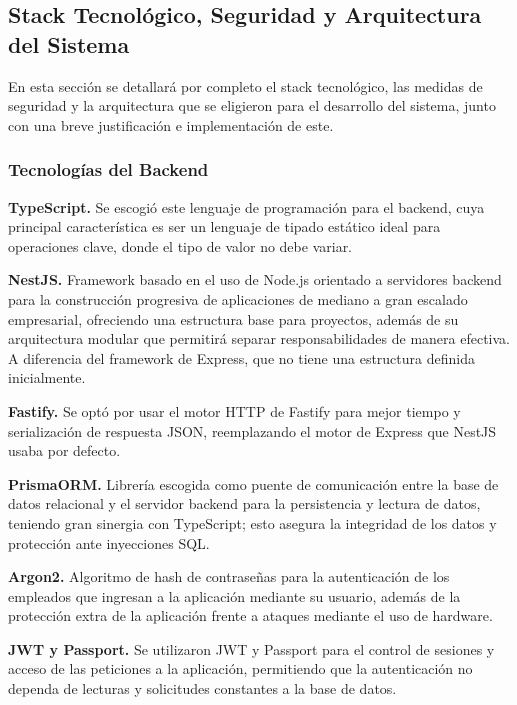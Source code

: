 \subsection{Stack Tecnológico, Seguridad y Arquitectura del Sistema}

En esta sección se detallará por completo el stack tecnológico, las medidas de seguridad y la arquitectura que se eligieron para el desarrollo del sistema, junto con una breve justificación e implementación de este. 

\subsubsection{Tecnologías del Backend}

\textbf{TypeScript.} Se escogió este lenguaje de programación para el backend, cuya principal característica es ser un lenguaje de tipado estático ideal para operaciones clave, donde el tipo de valor no debe variar. \par

\textbf{NestJS.} Framework basado en el uso de Node.js orientado a servidores backend para la construcción progresiva de aplicaciones de mediano a gran escalado empresarial, ofreciendo una estructura base para proyectos, además de su arquitectura modular que permitirá separar responsabilidades de manera efectiva. A diferencia del framework de Express, que no tiene una estructura definida inicialmente. \par

\textbf{Fastify.} Se optó por usar el motor HTTP de Fastify para mejor tiempo y serialización de respuesta JSON, reemplazando el motor de Express que NestJS usaba por defecto. \par

\textbf{PrismaORM.} Librería escogida como puente de comunicación entre la base de datos relacional y el servidor backend para la persistencia y lectura de datos, teniendo gran sinergia con TypeScript; esto asegura la integridad de los datos y protección ante inyecciones SQL. \par

\textbf{Argon2.} Algoritmo de hash de contraseñas para la autenticación de los empleados que ingresan a la aplicación mediante su usuario, además de la protección extra de la aplicación frente a ataques mediante el uso de hardware. \par

\textbf{JWT y Passport.} Se utilizaron JWT y Passport para el control de sesiones y acceso de las peticiones a la aplicación, permitiendo que la autenticación no dependa de lecturas y solicitudes constantes a la base de datos. \par

